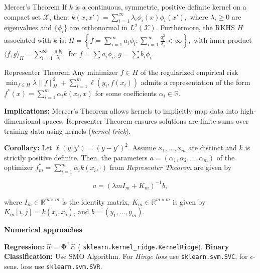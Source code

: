 \documentclass[a4paper,10pt]{article}
\newcommand{\subtitle}[1]{\begin{normalsize}\vspace{0.25cm}\textbf{#1} \end{normalsize}}
\begin{document}
\begin{small}
\begin{subbox}{Mercer's Theorem}
    If $k$ is a continuous, symmetric, positive definite kernel on a compact set $\mathcal{X}$, then:
    $
    k(x, x') = \sum_{i=1}^\infty \lambda_i \phi_i(x) \phi_i(x'),
    $
    where $\lambda_i \geq 0$ are eigenvalues and $\{\phi_i\}$ are orthonormal in $L^2(\mathcal{X})$. Furthermore, the RKHS $H$ associated with $k$ is:
    $
    H = \left\{ f = \sum_{i=1}^\infty a_i \phi_i : \sum_{i=1}^\infty \frac{a_i^2}{\lambda_i} < \infty \right\},
    $
    with inner product
    $
    \langle f, g \rangle_H = \sum_{i=1}^\infty \frac{a_i b_i}{\lambda_i},
    $
    for $f = \sum a_i \phi_i$, $g = \sum b_i \phi_i$.
\end{subbox}

\begin{subbox}{Representer Theorem}
    Any minimizer $f \in H$ of the regularized empirical risk
    $
    \min_{f \in H} \lambda \|f\|_H^2 + \sum_{i=1}^{m} \ell(y_i, f(x_i))
    $
    admits a representation of the form
    $
    f^*(x) = \sum_{i=1}^{m} \alpha_i k(x_i, x)
    $
    for some coefficients $\alpha_i \in \mathbb{R}$.
\end{subbox}

\textbf{Implications:} Mercer's Theorem allows kernels to implicitly map data into high-dimensional spaces. Representer Theorem ensures solutions are finite sums over training data using kernels (\textit{kernel trick}).

\textbf{Corollary:} Let $\ell(y, y') = (y - y')^2$. Assume $x_1, \dots, x_m$ are distinct and $k$ is strictly positive definite. Then, the parameters $a = (\alpha_1, \alpha_2, \dots, \alpha_m)$ of the optimizer $f_m^* = \sum_{i=1}^{m} \alpha_i k(x_i, \cdot)$ from \textit{Representer Theorem} are given by

\[
a = (\lambda m I_m + K_m)^{-1} b,
\]

where $I_m \in \mathbb{R}^{m \times m}$ is the identity matrix, $K_m \in \mathbb{R}^{m \times m}$ is given by $K_m[i,j] = k(x_i, x_j)$, and $b = (y_1, \dots, y_m)$.

\subtitle{Numerical approaches}

\textbf{Regression:} $\hat{w} = \mathbf{\Phi}^\top \hat{\alpha}$ ( \texttt{sklearn.kernel\_ridge.KernelRidge}).
\textbf{Binary Classification:} Use SMO Algorithm. For \textit{Hinge loss} use \texttt{sklearn.svm.SVC}, for $\epsilon$-sens. loss use \texttt{sklearn.svm.SVR}. 


\end{small}
\end{document}
